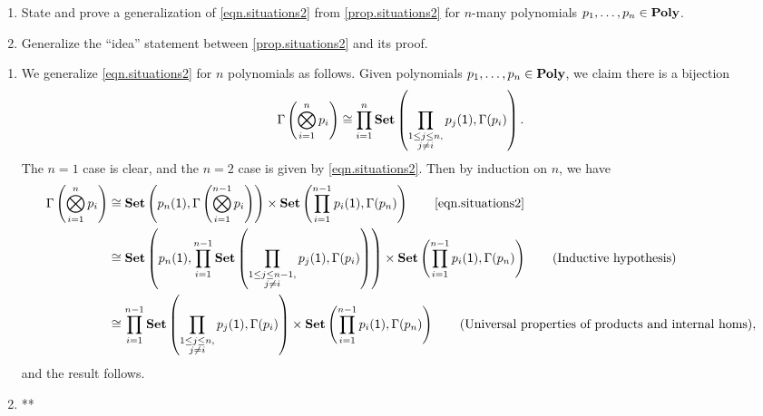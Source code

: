 \documentclass[Book-Poly]{subfiles}
\begin{document}
\begin{exercise}
\begin{enumerate}
	\item State and prove a generalization of \eqref{eqn.situations2} from \cref{prop.situations2} for $n$-many polynomials $p_1,\ldots,p_n\in\mathbf{Poly}$.
	\item Generalize the ``idea'' statement between \cref{prop.situations2} and its proof.
\qedhere
\end{enumerate}
\begin{solution}
\begin{enumerate}
    \item We generalize \eqref{eqn.situations2} for $n$ polynomials as follows.
    Given polynomials $p_1,\ldots,p_n\in\mathbf{Poly}$, we claim there is a bijection
    \[
        \Gamma\left(\bigotimes_{i=1}^n p_i \right) \cong \prod_{i=1}^n \mathbf{Set}\left(\prod_{\substack{1 \leq j \leq n, \\ j \neq i}} p_j(\textsf{1}), \Gamma(p_i)\right).
    \]
    The $n=1$ case is clear, and the $n=2$ case is given by \eqref{eqn.situations2}.
    Then by induction on $n$, we have
    \begin{align*}
        \Gamma\left(\bigotimes_{i=1}^n p_i \right) &\iso \smset\left(p_n(\1), \Gamma\left(\bigotimes_{i=1}^{n-1} p_i \right)\right) \times \smset\left(\prod_{i=1}^{n-1} p_i(\1), \Gamma(p_n)\right) \tag*{\eqref{eqn.situations2}} \\
        &\iso \smset\left(p_n(\1), \prod_{i=1}^{n-1} \smset\left(\prod_{\substack{1 \leq j \leq n-1, \\ j \neq i}} p_j(\1), \Gamma(p_i)\right)\right) \times \smset\left(\prod_{i=1}^{n-1} p_i(\1), \Gamma(p_n)\right) \tag{Inductive hypothesis} \\
        &\iso \prod_{i=1}^{n-1} \smset\left(\prod_{\substack{1 \leq j \leq n, \\ j \neq i}} p_j(\1), \Gamma(p_i)\right) \times \smset\left(\prod_{i=1}^{n-1} p_i(\1), \Gamma(p_n)\right) \tag{Universal properties of products and internal homs},
    \end{align*}
    and the result follows.
    \item **
\end{enumerate}
\end{solution}
\end{exercise}
\end{document}
